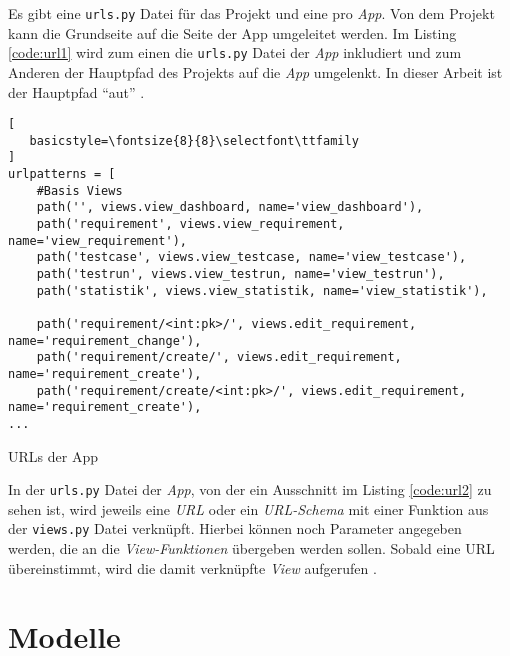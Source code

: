 \documentclass[11pt,a4paper]{report}
\begin{document}
Es gibt eine \verb|urls.py| Datei für das Projekt und eine pro \textit{App}. Von dem Projekt kann die Grundseite auf die Seite der App umgeleitet werden. Im Listing \ref{code:url1} wird zum einen die \verb|urls.py| Datei der \textit{App} inkludiert und zum Anderen der Hauptpfad des Projekts auf die \textit{App} umgelenkt. In dieser Arbeit ist der Hauptpfad "`aut"' \cite{mozillatuto5} .




\begin{listing}[htbp]
\begin{lstlisting}[
   basicstyle=\fontsize{8}{8}\selectfont\ttfamily
]
urlpatterns = [
    #Basis Views
    path('', views.view_dashboard, name='view_dashboard'),
    path('requirement', views.view_requirement, name='view_requirement'),
    path('testcase', views.view_testcase, name='view_testcase'),
    path('testrun', views.view_testrun, name='view_testrun'),
    path('statistik', views.view_statistik, name='view_statistik'),

    path('requirement/<int:pk>/', views.edit_requirement, name='requirement_change'),
    path('requirement/create/', views.edit_requirement, name='requirement_create'),
    path('requirement/create/<int:pk>/', views.edit_requirement, name='requirement_create'),
...
\end{lstlisting}
\caption{URLs der App}
\label{code:url2}
\end{listing}


In der \verb|urls.py| Datei der \textit{App}, von der ein Ausschnitt im Listing \ref{code:url2} zu sehen ist, wird jeweils eine \textit{URL} oder ein \textit{URL-Schema} mit einer Funktion aus der \verb|views.py| Datei verknüpft. Hierbei können noch Parameter angegeben werden, die an die \textit{View-Funktionen} übergeben werden sollen. Sobald eine URL übereinstimmt, wird die damit verknüpfte \textit{View} aufgerufen \cite{djangotuto1}.


\section{Modelle}
\end{document}
